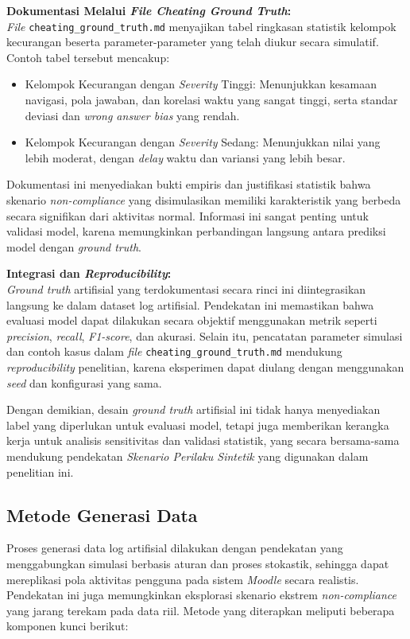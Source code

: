 \textbf{Dokumentasi Melalui \textit{File Cheating Ground Truth}:} \\
\textit{File} \texttt{cheating\_ground\_truth.md} menyajikan tabel ringkasan statistik kelompok kecurangan beserta parameter-parameter yang telah diukur secara simulatif. Contoh tabel tersebut mencakup:
\begin{itemize}
    \item Kelompok Kecurangan dengan \textit{Severity} Tinggi: Menunjukkan kesamaan navigasi, pola jawaban, dan korelasi waktu yang sangat tinggi, serta standar deviasi dan \textit{wrong answer bias} yang rendah.
    \item Kelompok Kecurangan dengan \textit{Severity} Sedang: Menunjukkan nilai yang lebih moderat, dengan \textit{delay} waktu dan variansi yang lebih besar.
\end{itemize}

Dokumentasi ini menyediakan bukti empiris dan justifikasi statistik bahwa skenario \textit{non-compliance} yang disimulasikan memiliki karakteristik yang berbeda secara signifikan dari aktivitas normal. Informasi ini sangat penting untuk validasi model, karena memungkinkan perbandingan langsung antara prediksi model dengan \textit{ground truth}.

\textbf{Integrasi dan \textit{Reproducibility}:} \\
\textit{Ground truth} artifisial yang terdokumentasi secara rinci ini diintegrasikan langsung ke dalam dataset log artifisial. Pendekatan ini memastikan bahwa evaluasi model dapat dilakukan secara objektif menggunakan metrik seperti \textit{precision}, \textit{recall}, \textit{F1-score}, dan akurasi. Selain itu, pencatatan parameter simulasi dan contoh kasus dalam \textit{file} \texttt{cheating\_ground\_truth.md} mendukung \textit{reproducibility} penelitian, karena eksperimen dapat diulang dengan menggunakan \textit{seed} dan konfigurasi yang sama.

Dengan demikian, desain \textit{ground truth} artifisial ini tidak hanya menyediakan label yang diperlukan untuk evaluasi model, tetapi juga memberikan kerangka kerja untuk analisis sensitivitas dan validasi statistik, yang secara bersama-sama mendukung pendekatan \textit{Skenario Perilaku Sintetik} yang digunakan dalam penelitian ini.

\subsection{Metode Generasi Data}
\label{sec:metodeGenerasiData}
Proses generasi data log artifisial dilakukan dengan pendekatan yang menggabungkan simulasi berbasis aturan dan proses stokastik, sehingga dapat mereplikasi pola aktivitas pengguna pada sistem \textit{Moodle} secara realistis. Pendekatan ini juga memungkinkan eksplorasi skenario ekstrem \textit{non-compliance} yang jarang terekam pada data riil. Metode yang diterapkan meliputi beberapa komponen kunci berikut:

